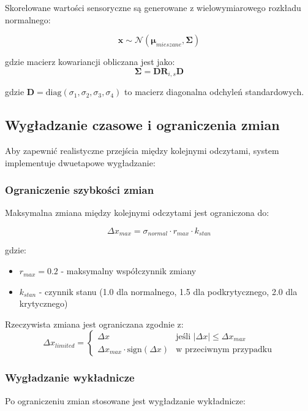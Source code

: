 Skorelowane wartości sensoryczne są generowane z wielowymiarowego rozkładu normalnego:

$$\mathbf{x} \sim \mathcal{N}(\boldsymbol{\mu}_{mieszane}, \boldsymbol{\Sigma})$$

gdzie macierz kowariancji obliczana jest jako:
$$\boldsymbol{\Sigma} = \mathbf{D} \mathbf{R}_{i,s} \mathbf{D}$$

gdzie $\mathbf{D} = \text{diag}(\sigma_1, \sigma_2, \sigma_3, \sigma_4)$ to macierz diagonalna odchyleń standardowych.

\subsection{Wygładzanie czasowe i ograniczenia zmian}
\label{subsec:wygladzanie_czasowe}

Aby zapewnić realistyczne przejścia między kolejnymi odczytami, system implementuje dwuetapowe wygładzanie:

\subsubsection{Ograniczenie szybkości zmian}

Maksymalna zmiana między kolejnymi odczytami jest ograniczona do:

$$\Delta x_{max} = \sigma_{normal} \cdot r_{max} \cdot k_{stan}$$

gdzie:
\begin{itemize}
    \item $r_{max} = 0.2$ - maksymalny współczynnik zmiany
    \item $k_{stan}$ - czynnik stanu (1.0 dla normalnego, 1.5 dla podkrytycznego, 2.0 dla krytycznego)
\end{itemize}

Rzeczywista zmiana jest ograniczana zgodnie z:
$$\Delta x_{limited} = \begin{cases}
\Delta x & \text{jeśli } |\Delta x| \leq \Delta x_{max} \\
\Delta x_{max} \cdot \text{sign}(\Delta x) & \text{w przeciwnym przypadku}
\end{cases}$$

\subsubsection{Wygładzanie wykładnicze}

Po ograniczeniu zmian stosowane jest wygładzanie wykładnicze:


